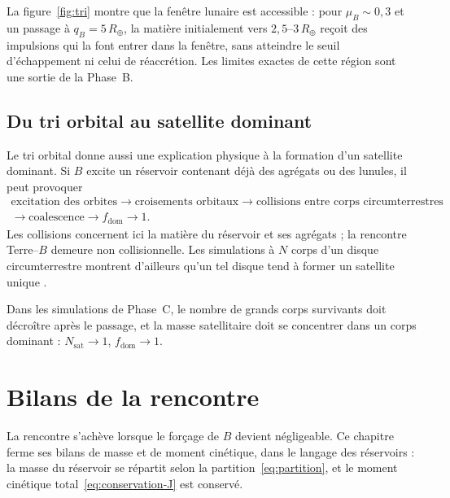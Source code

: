 \documentclass[11pt,a4paper,openany]{report}
\newcommand{\Rt}{R_{\oplus}}
\begin{document}
\begin{controle}
La figure~\ref{fig:tri} montre que la fenêtre lunaire est accessible : pour $\mu_B\sim0{,}3$ et un
passage à $q_B=5\,\Rt$, la matière initialement vers $2{,}5$--$3\,\Rt$ reçoit des impulsions qui la
font entrer dans la fenêtre, sans atteindre le seuil d'échappement ni celui de réaccrétion. Les
limites exactes de cette région sont une sortie de la Phase~B.
\end{controle}

\section{Du tri orbital au satellite dominant}

Le tri orbital donne aussi une explication physique à la formation d'un satellite dominant. Si $B$
excite un réservoir contenant déjà des agrégats ou des lunules, il peut provoquer
\begin{equation}
\begin{gathered}
\text{excitation des orbites}\rightarrow\text{croisements orbitaux}\rightarrow
\text{collisions entre corps circumterrestres}\\
\rightarrow\text{coalescence}\rightarrow f_{\mathrm{dom}}\rightarrow1.
\end{gathered}
\label{eq:chaine-dominance}
\end{equation}
Les collisions concernent ici la matière du réservoir et ses agrégats ; la rencontre Terre--$B$
demeure non collisionnelle. Les simulations à $N$ corps d'un disque circumterrestre montrent
d'ailleurs qu'un tel disque tend à former un satellite unique \cite{Kokubo2000}.

\begin{consequence}
Dans les simulations de Phase~C, le nombre de grands corps survivants doit décroître après le
passage, et la masse satellitaire doit se concentrer dans un corps dominant : $N_{\mathrm{sat}}\to1$,
$f_{\mathrm{dom}}\to1$.
\end{consequence}

\chapter{Bilans de la rencontre}
\label{ch:bilans}

La rencontre s'achève lorsque le forçage de $B$ devient négligeable. Ce chapitre ferme ses bilans
de masse et de moment cinétique, dans le langage des réservoirs : la masse du réservoir se
répartit selon la partition~\eqref{eq:partition}, et le moment cinétique total~\eqref{eq:conservation-J}
est conservé.
\end{document}
